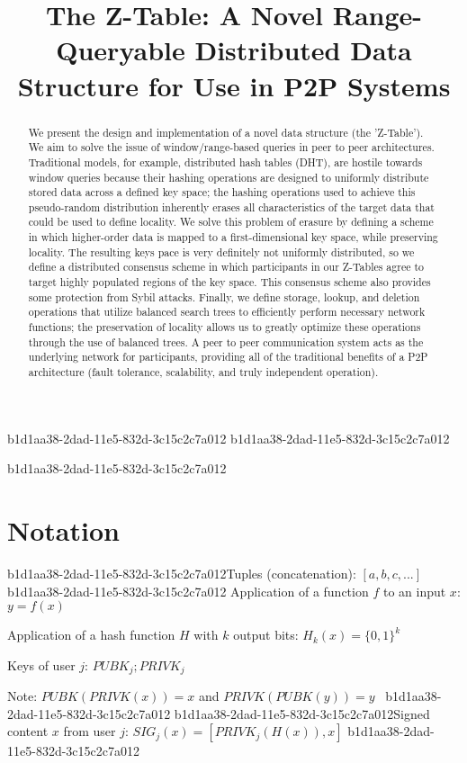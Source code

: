 \documentclass[12pt]{article}
\title{The Z-Table: A Novel Range-Queryable Distributed Data Structure for Use in P2P Systems}
\begin{document}
\maketitle
b1d1aa38-2dad-11e5-832d-3c15c2c7a012
b1d1aa38-2dad-11e5-832d-3c15c2c7a012\begin{abstract}
We present the design and implementation of a novel data structure (the 'Z-Table'). We aim to solve the issue of window/range-based queries in peer to peer architectures. Traditional models, for example,  distributed hash tables (DHT), are hostile towards window queries because their hashing operations are designed to uniformly distribute stored data across a defined key space; the hashing operations used to achieve this pseudo-random distribution inherently erases all characteristics of the target data that could be used to define locality. We solve this problem of erasure by defining a scheme in which higher-order data is mapped to a first-dimensional key space, while preserving locality. The resulting keys pace is very definitely not uniformly distributed, so we define a distributed consensus scheme in which participants in our Z-Tables agree to target highly populated regions of the key space. This consensus scheme also provides some protection from Sybil attacks. Finally, we define storage, lookup, and deletion operations that utilize balanced search trees to efficiently perform necessary network functions; the preservation of locality allows us to greatly optimize these operations through the use of balanced trees. A peer to peer communication system acts as the underlying network for participants, providing all of the traditional benefits of a P2P architecture (fault tolerance, scalability, and truly independent operation).
\end{abstract}
b1d1aa38-2dad-11e5-832d-3c15c2c7a012
\section{Notation}

b1d1aa38-2dad-11e5-832d-3c15c2c7a012Tuples (concatenation): $[a,b,c,...]$
b1d1aa38-2dad-11e5-832d-3c15c2c7a012
Application of a function $f$ to an input $x$: $y=f(x)$

Application of a hash function $H$ with $k$ output bits: $H_{k}(x) = \{0,1\}^k$

Keys of user $j$: $ PUBK_j; PRIVK_j $

Note: $PUBK(PRIVK(x)) = x$ and $PRIVK(PUBK(y)) = y$~
b1d1aa38-2dad-11e5-832d-3c15c2c7a012
b1d1aa38-2dad-11e5-832d-3c15c2c7a012Signed content $x$ from user $j$: $SIG_j(x) = \left[ PRIVK_j( H(x) ), x \right]$
b1d1aa38-2dad-11e5-832d-3c15c2c7a012
\end{document}
